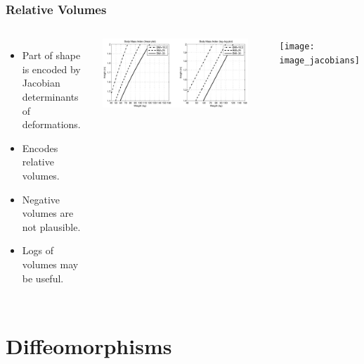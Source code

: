 \documentclass{beamer}
\begin{document}
\begin{frame}
\frametitle{Relative Volumes}
\begin{columns}[c]
\begin{itemize}
\item{Part of shape is encoded by Jacobian determinants of deformations.}
\item{Encodes relative volumes.}
\item{Negative volumes are not plausible.}
\item{Logs of volumes may be useful.}
\end{itemize}
\begin{center}
\includegraphics[width=0.9\textwidth]{bmi}
\end{center}
\texttt{[image: image\_jacobians]}
\end{columns}
\end{frame}

\section{Diffeomorphisms}
\end{document}
